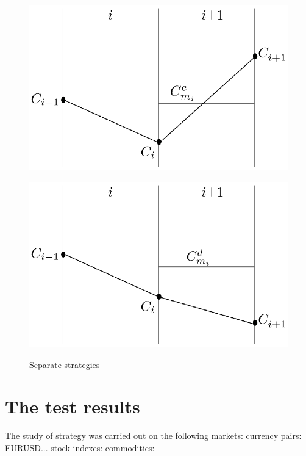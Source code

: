 \documentclass{tewiart}
\begin{document}
\begin{figure}[h]
\begin{minipage}{.49\linewidth}
\label{dwu}
\end{minipage}
\\
\begin{minipage}{.49\linewidth}
\centering \includegraphics[width=\textwidth]{rysunek2c.eps}
\label{cztero}
\end{minipage}
\begin{minipage}{.49\linewidth}
\centering 
\includegraphics[width=\textwidth]{rysunek2d.eps}
\label{mansard}
\end{minipage}
\caption{Separate strategies}
\end{figure}
\FloatBarrier


\section{The test results}
The study of strategy was carried out on the following markets:
currency pairs: EURUSD...
stock indexes: 
commodities: 
\end{document}
